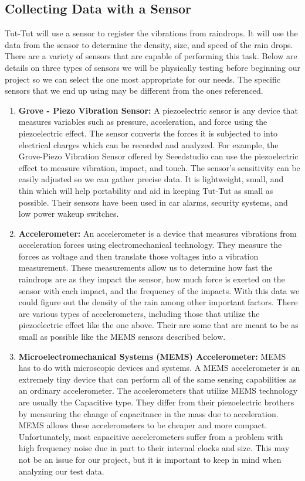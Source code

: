 \documentclass[letterpaper,10pt,draftclsnofoot,onecolumn]{article}
\begin{document}
\subsection{Collecting Data with a Sensor}
Tut-Tut will use a sensor to register the vibrations from raindrops. It will use the data from the sensor to determine the density, size, and speed of the rain drops. There are a variety of sensors that are capable of performing this task. Below are details on three types of sensors we will be physically testing before beginning our project so we can select the one most appropriate for our needs. The specific sensors that we end up using may be different from the ones referenced.

\begin{enumerate}
    \item \textbf{Grove - Piezo Vibration Sensor:} A piezoelectric sensor is any device that measures variables such as pressure, acceleration, and force using the piezoelectric effect. The sensor converts the forces it is subjected to into electrical charges which can be recorded and analyzed. \cite{piezosensor} For example, the Grove-Piezo Vibration Sensor offered by Seeedstudio can use the piezoelectric effect to measure vibration, impact, and touch. The sensor's sensitivity can be easily adjusted so we can gather precise data. It is lightweight, small, and thin which will help portability and aid in keeping Tut-Tut as small as possible. Their sensors have been used in car alarms, security systems, and low power wakeup switches. \cite{grovepiezosensor}
    \item \textbf{Accelerometer:} An accelerometer is a device that measures vibrations from acceleration forces using electromechanical technology. They measure the forces as voltage and then translate those voltages into a vibration measurement. \cite{accelerator} These measurements allow us to determine how fast the raindrops are as they impact the sensor, how much force is exerted on the sensor with each impact, and the frequency of the impacts. With this data we could figure out the density of the rain among other important factors. There are various types of accelerometers, including those that utilize the piezoelectric effect like the one above. Their are some that are meant to be as small as possible like the MEMS sensors described below.
    \item \textbf{Microelectromechanical Systems (MEMS) Accelerometer:} MEMS has to do with microscopic devices and systems. A MEMS accelerometer is an extremely tiny device that can perform all of the same sensing capabilities as an ordinary accelerometer. The accelerometers that utilize MEMS technology are usually the Capacitive type. They differ from their piezoelectric brothers by measuring the change of capacitance in the mass due to acceleration. MEMS allows these accelerometers to be cheaper and more compact. Unfortunately, most capacitive accelerometers suffer from a problem with high frequency noise due in part to their internal clocks and size. \cite{mems} This may not be an issue for our project, but it is important to keep in mind when analyzing our test data. 
\end{enumerate}
\end{document}
